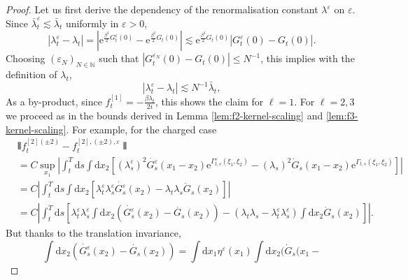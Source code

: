 \documentclass[11pt, a4paper]{scrartcl}
\numberwithin{equation}{section}
\theoremstyle{plain}
\theoremstyle{remark}
\newcommand{\mathd}{\mathrm{d}}
\newcommand{\mathe}{\mathrm{e}}
\begin{document}
   \begin{proof}
     Let us first derive the dependency of the renormalisation constant
     $\lambda^{\varepsilon}$ on $\varepsilon$. Since $\bar{\lambda}^{\varepsilon}_t
     \lesssim \bar{\lambda}_t$ uniformly in $\varepsilon > 0$,
     \[ | \lambda_t^{\varepsilon} - \lambda_t | = \left|
        \mathe^{\frac{\beta^2}{2} G_t^{\varepsilon} (0)} -
        \mathe^{\frac{\beta^2}{2} G_t (0)} \right| \lesssim
        \mathe^{\frac{\beta^2}{2} G_t (0)} | G_t^{\varepsilon} (0) - G_t (0) | .
     \]
     Choosing $(\varepsilon_N)_{N \in \mathbb{N}}$ such that $|
     G^{\varepsilon_N}_t (0) - G_t (0) | \leqslant N^{- 1}$, this implies with
     the definition of $\lambda_t$,
     \[ | \lambda_t^{\varepsilon} - \lambda_t | \lesssim N^{- 1} \bar{\lambda}_t, \]
     As a by-product, since $f^{[1]}_t = - \frac{\beta \lambda_t}{2 i}$, this
     shows the claim for $\ell = 1$. For $\ell = 2, 3$ we proceed as in the
     bounds derived in Lemma \ref{lem:f2-kernel-scaling} and
     \ref{lem:f3-kernel-scaling}. For example, for the charged case
      \begin{equation*}
        \begin{aligned}
          &\interleave f^{[2] (\pm 2)}_t - f_t^{[2], (\pm 2), \varepsilon}
          \interleave \\
        & =  C \sup_{x_1}  \left| \int_t^T \mathd s \int \mathd
          x_2 [(\lambda_s^{\varepsilon})^2 \dot{G^{\varepsilon}_s} (x_1 - x_2)
          \mathe^{\Gamma_{t, s}^{\varepsilon} (\xi_1, \xi_2)} - (\lambda_s)^2 
          \dot{G}_s (x_1 - x_2) \mathe^{\Gamma_{t, s} (\xi_1, \xi_2)}] \right|\\
        & =  C \left| \int_t^T \mathd s \int \mathd x_2
          [\lambda_t^{\varepsilon} \lambda_s^{\varepsilon}
          \dot{G^{\varepsilon}_s} (x_2) - \lambda_t \lambda_s  \dot{G}_s (x_2)]
          \right|\\
        & =  C \left| \int_t^T \mathd s \left[ \lambda_t^{\varepsilon}
          \lambda_s^{\varepsilon} \int \mathd x_2 \left( \dot{G^{\varepsilon}_s}
          (x_2) - \dot{G_s} \left( x_2 \right) \right) - (\lambda_t \lambda_s -
          \lambda_t^{\varepsilon} \lambda_s^{\varepsilon}) \int \mathd x_2
          \dot{G}_s (x_2) \right] \right| .
        \end{aligned}
      \end{equation*}
     But thanks to the translation invariance,
     \[ \int \mathd x_2 (\dot{G^{\varepsilon}_s} (x_2) - \dot{G_s} (x_2)) = \int
        \mathd x_1 \eta^{\varepsilon} (x_1)  \int \mathd x_2 (\dot{G}_s (x_1 -
\]
\end{proof}
\end{document}

